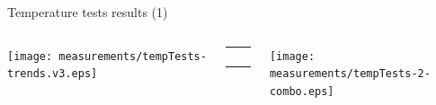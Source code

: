 \documentclass[compress,red]{beamer}
\begin{document}
\begin{frame}{Temperature tests results (1)}


  \begin{columns}[c]
		\hspace{-1.0cm}
		\begin{center}
		\texttt{[image: measurements/tempTests-trends.v3.eps]}
		\end{center}

		\begin{center}
		  \begin{table}[!t] \footnotesize 
		  \begin{tabular}{ c  c }     
		  \multicolumn{2}{c}{ }       \\         
		   \multicolumn{2}{c}{ }       \\    
		     &    \\ 
		    &     \\ 
		  \end{tabular}
		  \end{table}   		
		\end{center}

		\hspace{-0.8cm}
		\begin{center}
		\texttt{[image: measurements/tempTests-2-combo.eps]}
		\end{center}


\end{columns}
\end{frame}
\end{document}
